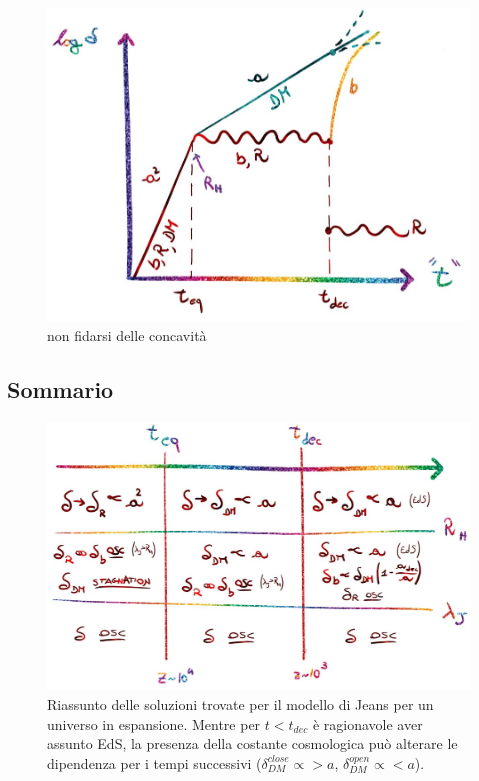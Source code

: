 \begin{figure}[H]
    \centering
    \includegraphics[width=.8 \textwidth]{Pictures/6/dmgrowingfactor.jpg}
    \caption{non fidarsi delle concavità}
\end{figure}


\subsection{Sommario}

\begin{figure}[H]
    \centering
    \includegraphics[width=\textwidth]{Pictures/6/sommario.jpg}
    \caption{Riassunto delle soluzioni trovate per il modello di Jeans per un universo in espansione. Mentre per $t<t_{dec}$ è ragionavole aver assunto EdS, la presenza della costante cosmologica può alterare le dipendenza per i tempi successivi ($\delta_{DM}^{close}\propto > a$, $\delta_{DM}^{open}\propto < a$). }
\end{figure}